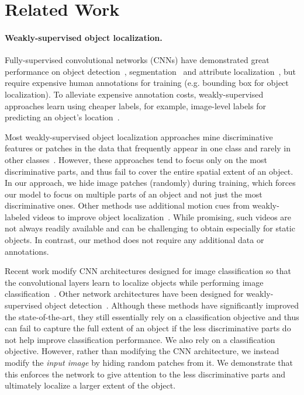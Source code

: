 \documentclass[10pt,twocolumn,letterpaper]{article}
\begin{document}
\section{Related Work}\paragraph{Weakly-supervised object localization.}
Fully-supervised convolutional networks (CNNs) have demonstrated great performance on object detection~\cite{girshick-cvpr2014,girshick-iccv2015,liu-eccv2016}, segmentation~\cite{long-cvpr2015} and attribute localization~\cite{duan-cvpr2012,zhang-cvpr2014,kiapour-eccv2014}, but require expensive human annotations for training (e.g. bounding box for object localization). To alleviate expensive annotation costs, weakly-supervised approaches learn using cheaper labels, for example, image-level labels for predicting an object's location~\cite{weber-eccv2000,fergus-cvpr2003,Crandall-ECCV2006,siva-eccv2012,bilen-bmcv2014,song-nips2014,wang-eccv2014,cinbis-arxiv2015,Oquab-cvpr15,zhou-cvpr2016}. 

Most weakly-supervised object localization approaches mine discriminative features or patches in the data that frequently appear in one class and rarely in other classes~\cite{weber-eccv2000,fergus-cvpr2003,Crandall-ECCV2006,siva-eccv2012,bilen-bmcv2014,cinbis-cvpr2014,song-icml2014,song-nips2014,cinbis-arxiv2015}. However, these approaches tend to focus only on the most discriminative parts, and thus fail to cover the entire spatial extent of an object.  In our approach, we hide image patches (randomly) during training, which forces our model to focus on multiple parts of an object and not just the most discriminative ones.   Other methods use additional motion cues from weakly-labeled videos to improve object localization~\cite{prest-cvpr2012,krishna-cvpr2016}.  While promising, such videos are not always readily available and can be challenging to obtain especially for static objects.  In contrast, our method does not require any additional data or annotations.

Recent work modify CNN architectures designed for image classification so that the convolutional layers learn to localize objects while performing image classification~\cite{Oquab-cvpr15,zhou-cvpr2016}.  Other network architectures have been designed for weakly-supervised object detection~\cite{Jaderberg-nips2015,Bilen-cvpr2016,kantorov-eccv2016}.  Although these methods have significantly improved the state-of-the-art, they still essentially rely on a classification objective and thus can fail to capture the full extent of an object if the less discriminative parts do not help improve classification performance.  We also rely on a classification objective. However, rather than modifying the CNN architecture, we instead modify the \emph{input image} by hiding random patches from it.  We demonstrate that this enforces the network to give attention to the less discriminative parts and ultimately localize a larger extent of the object.
\end{document}
